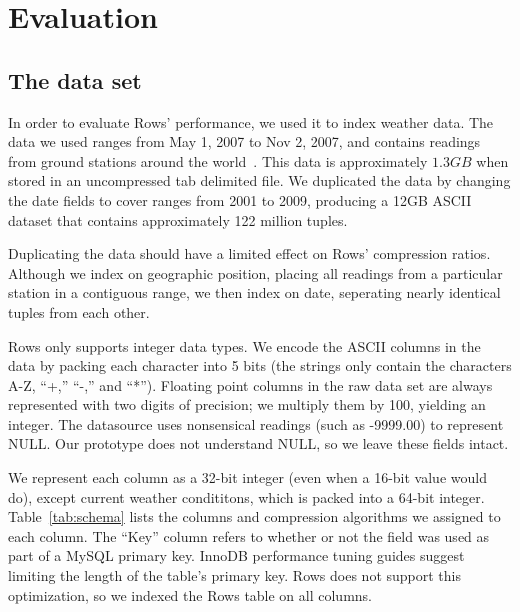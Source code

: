 \documentclass{sig-alternate-sigmod08}
\newcommand{\rows}{Rows\xspace}
\newcommand{\rowss}{Rows'\xspace}
\begin{document}
\section{Evaluation}

\subsection{The data set}

In order to evaluate \rowss performance, we used it to index
weather data.  The data we used ranges from May 1,
2007 to Nov 2, 2007, and contains readings from ground stations around
the world~\cite{nssl}.  This data is approximately $1.3GB$ when stored in an
uncompressed tab delimited file.  We duplicated the data by changing
the date fields to cover ranges from 2001 to 2009, producing a 12GB
ASCII dataset that contains approximately 122 million tuples.

Duplicating the data should have a limited effect on \rowss
compression ratios.  Although we index on geographic position, placing
all readings from a particular station in a contiguous range, we then
index on date, seperating nearly identical tuples from each other.

\rows only supports integer data types.  We encode the ASCII columns
in the data by packing each character into 5 bits (the strings only
contain the characters A-Z, ``+,'' ``-,'' and ``*'').  Floating point columns in
the raw data set are always represented with two digits of precision;
we multiply them by 100, yielding an integer.  The datasource uses
nonsensical readings (such as -9999.00) to represent NULL.  Our
prototype does not understand NULL, so we leave these fields intact.

We represent each column as a 32-bit integer (even when a 16-bit value
would do), except current weather condititons, which is packed into a
64-bit integer.  Table~\ref{tab:schema} lists the columns and
compression algorithms we assigned to each column.  The ``Key'' column refers
to whether or not the field was used as part of a MySQL primary key.
InnoDB performance tuning guides suggest limiting the length of the
table's primary key.  \rows does not support this optimization, so we
indexed the \rows table on all columns.
\end{document}
